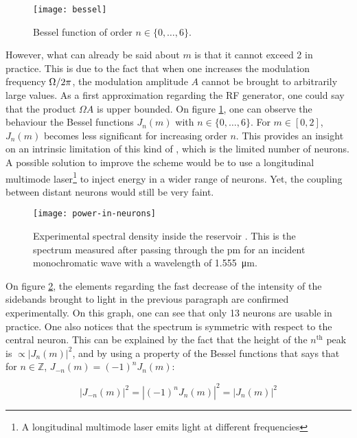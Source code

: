 \begin{figure}[h]
	\centering
	\texttt{[image: bessel]}
	\caption{Bessel function of order $n \in \{0,\dots,6\}$.}
	\label{bessel}
\end{figure}

However, what can already be said about $m$ is that it cannot exceed 2 in practice. This is due to the fact that when one increases the modulation frequency $\Omega/2\pi$, the modulation amplitude $A$ cannot be brought to arbitrarily large values. As a first approximation regarding the RF generator, one could say that the product $\Omega A$ is upper bounded. On figure \ref{bessel}, one can observe the behaviour the Bessel functions $J_n(m)$ with $n \in \{0,\dots, 6\}$. For $m \in [0,2]$, $J_n(m)$ becomes less significant for increasing order $n$. This provides an insight on an intrinsic limitation of this kind of \rcer, which is the limited number of neurons. A possible solution to improve the scheme would be to use a longitudinal multimode laser\footnote{A longitudinal multimode laser emits light at different frequencies} to inject energy in a wider range of neurons. Yet, the coupling between distant neurons would still be very faint.\\

\begin{figure}[h]
	\centering
	\texttt{[image: power-in-neurons]}
	\caption{Experimental spectral density inside the reservoir \cite{AkroutAkram2016Pprc}. This is the spectrum measured after passing through the \gls{pm} for an incident monochromatic wave with a wavelength of \SI{1.555}{\micro\metre}.}
	\label{power-in-neurons}
\end{figure}

On figure \ref{power-in-neurons}, the elements regarding the fast decrease of the intensity of the sidebands brought to light in the previous paragraph are confirmed experimentally. On this graph, one can see that only 13 neurons are usable in practice. One also notices that the spectrum is symmetric with respect to the central neuron. This can be explained by the fact that the height of the $n^{\text{th}}$ peak is $\propto |J_n(m)|^2$, and by using a property of the Bessel functions that says that for $n \in \mathbb{Z}$, $J_{-n}(m)=(-1)^n J_n(m)$:

\begin{equation}
	|J_{-n}(m)|^2 = |(-1)^n J_n(m)|^2 = |J_n(m)|^2
\end{equation}

